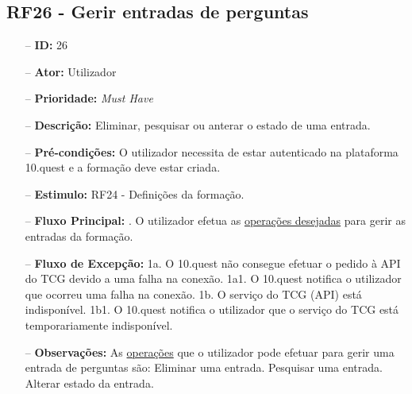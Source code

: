 \subsection{RF26 - Gerir entradas de perguntas}
\begin{itemize}
	\item[--] \textbf{ID:} 26
	\item[--]  \textbf{Ator:} Utilizador
	\item[--]  \textbf{Prioridade:} \textit{Must Have}
	\item[--]  \textbf{Descrição:} Eliminar, pesquisar ou anterar o estado de uma entrada.
	\item[--]  \textbf{Pré-condições:} O utilizador necessita de estar autenticado na plataforma 10.quest e a formação deve estar criada.
	\item[--]  \textbf{Estimulo:} RF24 - Definições da formação.
	\item[--]  \textbf{Fluxo Principal:} 
		. O utilizador efetua as \underline{operações desejadas} para gerir as entradas da formação.
	\item[--]  \textbf{Fluxo de Excepção:} 
		\subitem 1a. O 10.quest não consegue efetuar o pedido à API do TCG devido a uma falha na conexão.
		\subitem 1a1. O 10.quest notifica o utilizador que ocorreu uma falha na conexão.
		\subitem 1b. O serviço do TCG (API) está indisponível.
		\subitem 1b1. O 10.quest notifica o utilizador que o serviço do TCG está temporariamente indisponível. 
	\item[--]  \textbf{Observações:} As \underline{operações} que o utilizador pode efetuar para gerir uma entrada de perguntas são: 
		\subitem Eliminar uma entrada.
		\subitem Pesquisar uma entrada.
		\subitem Alterar estado da entrada.
\end{itemize}
\newpage

